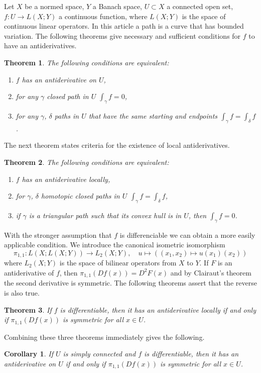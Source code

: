 \documentclass[12pt]{article}
\newtheorem{thm}{Theorem}
\newtheorem{cor}{Corollary}
\begin{document}
Let $X$ be a normed space, $Y$ a Banach space, $U\subset X$ a connected open set, $f\colon U\to L(X;Y)$ a continuous function, where $L(X;Y)$ is the space of continuous linear operators. In this article a path is a curve that has bounded variation. The following theorems give necessary and sufficient conditions for $f$ to have an antiderivatives.

\begin{thm}
The following conditions are equivalent:
\begin{enumerate}
\item $f$ has an antiderivative on $U$,
\item for any $\gamma$ closed path in $U$ $\int_\gamma f=0$,
\item for any $\gamma$, $\delta$ paths in $U$ that have the same starting and endpoints $\int_\gamma f=\int_\delta f$.
\end{enumerate}
\end{thm}

The next theorem states criteria for the existence of local antiderivatives.

\begin{thm}
The following conditions are equivalent:
\begin{enumerate}
\item $f$ has an antiderivative locally,
\item for $\gamma$, $\delta$ homotopic closed paths in $U$ $\int_\gamma f=\int_\delta f$,
\item if $\gamma$ is a triangular path such that its convex hull is in $U$, then $\int_\gamma f=0$.
\end{enumerate}
\end{thm}
With the stronger assumption that $f$ is differenciable we can obtain a more easily applicable condition. We introduce the  canonical isometric isomorphism
\[\pi_{1,1}\colon L(X;L(X;Y))\to L_2(X;Y),\quad u\mapsto((x_1,x_2)\mapsto u(x_1)(x_2))\]
where $L_2(X;Y)$ is the space of bilinear operators from $X$ to $Y$. If $F$ is an antiderivative of $f$, then $\pi_{1,1}(Df(x))=D^2F(x)$ and by Clairaut's theorem the second derivative is symmetric. The following theorems assert that the reverse is also true.

\begin{thm}
If $f$ is differentiable, then it has an antiderivative locally if and only if $\pi_{1,1}(Df(x))$ is symmetric for all $x\in U$.
\end{thm}

Combining these three theorems immediately gives the following.

\begin{cor}
If $U$ is simply connected and $f$ is differentiable, then it has an antiderivative on $U$ if and only if $\pi_{1,1}(Df(x))$ is symmetric for all $x\in U$.
\end{cor}

\end{document}
